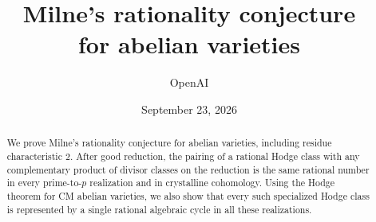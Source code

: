 \documentclass[11pt]{article}
\title{Milne's rationality conjecture\protect\\ for abelian varieties}
\author{OpenAI}
\date{September 23, 2026}
\theoremstyle{definition}
\theoremstyle{remark}
\numberwithin{equation}{section}
\begin{document}
\maketitle
\vspace{-1em}
\begin{abstract}
We prove Milne's rationality conjecture for abelian varieties, including
residue characteristic \(2\). After good reduction, the pairing of a
rational Hodge class with any complementary product of divisor classes
on the reduction is the same rational number in every prime-to-\(p\)
realization and in crystalline cohomology. Using the Hodge theorem for CM
abelian varieties, we also show that every such specialized Hodge class
is represented by a single rational algebraic cycle in all these realizations.
\end{abstract}







\end{document}
